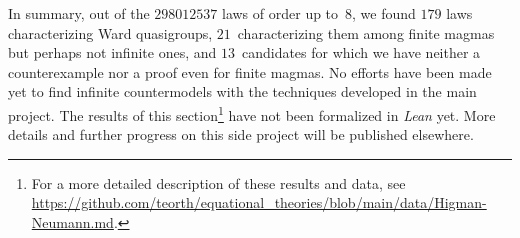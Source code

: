 In summary, out of the $\num{298012537}$ laws of order up to~$8$, we found $179$ laws characterizing Ward quasigroups, $21$~characterizing them among finite magmas but perhaps not infinite ones, and $13$~candidates for which we have neither a counterexample nor a proof even for finite magmas. No efforts have been made yet to find infinite countermodels with the techniques developed in the main project. The results of this section\footnote{For a more detailed description of these results and data, see \url{https://github.com/teorth/equational_theories/blob/main/data/Higman-Neumann.md}.} have not been formalized in \emph{Lean} yet. More details and further progress on this side project will be published elsewhere.
